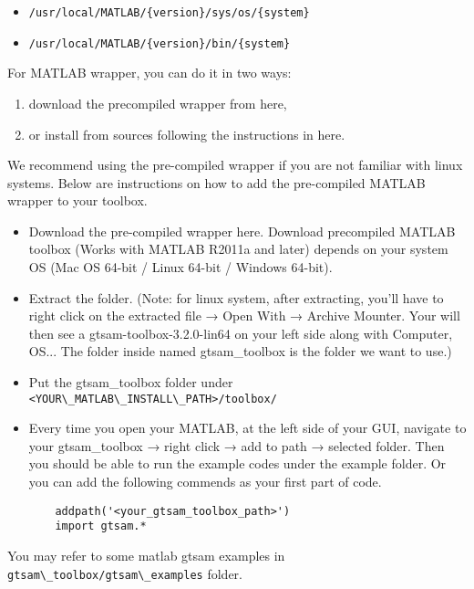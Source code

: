 \documentclass[tp]{lcc}
\begin{document}
\begin{itemize}
    \item \lstinline[style=bash]|/usr/local/MATLAB/{version}/sys/os/{system}|
    \item \lstinline[style=bash]|/usr/local/MATLAB/{version}/bin/{system}|
\end{itemize}

For MATLAB wrapper, you can do it in two ways:

\begin{enumerate}
    \item download the precompiled wrapper from here,
    \item or install from sources following the instructions in here.
\end{enumerate}

We recommend using the pre-compiled wrapper if you are not familiar with linux systems. Below are instructions on how to add the pre-compiled MATLAB wrapper to your toolbox.

\begin{itemize}
    \item Download the pre-compiled wrapper here. Download precompiled MATLAB toolbox (Works with MATLAB R2011a and later) depends on your system OS (Mac OS 64-bit / Linux 64-bit / Windows 64-bit).
    \item Extract the folder. (Note: for linux system, after extracting, you'll have to right click on the extracted file → Open With → Archive Mounter. Your will then see a gtsam-toolbox-3.2.0-lin64 on your left side along with Computer, OS... The folder inside named gtsam\_toolbox is the folder we want to use.)
    \item Put the gtsam\_toolbox folder under \lstinline[style=bash]{<YOUR\_MATLAB\_INSTALL\_PATH>/toolbox/}
    \item Every time you open your MATLAB, at the left side of your GUI, navigate to your gtsam\_toolbox → right click → add to path → selected folder. Then you should be able to run the example codes under the example folder. Or you can add the following commends as your first part of code.
    \begin{verbatim}
    addpath('<your_gtsam_toolbox_path>')
    import gtsam.*
    \end{verbatim}
\end{itemize}

You may refer to some matlab gtsam examples in \lstinline[style=bash]{gtsam\_toolbox/gtsam\_examples} folder.
\end{document}
